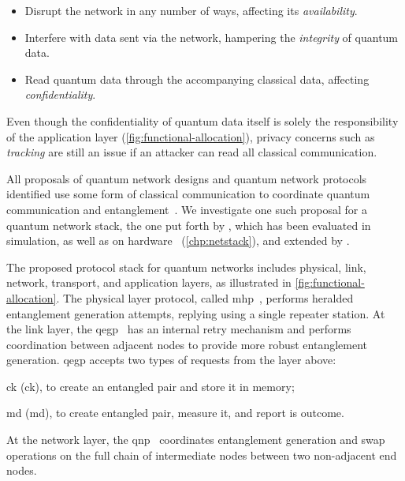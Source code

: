 \begin{itemize}
    \item Disrupt the network in any number of ways, affecting its \emph{availability}.
    \item Interfere with data sent via the network, hampering the \emph{integrity} of quantum data.
    \item Read quantum data through the accompanying classical data, affecting
          \emph{confidentiality}.
\end{itemize}
Even though the confidentiality of quantum data itself is solely the responsibility of the
application layer (\cref{fig:functional-allocation}), privacy concerns such as \emph{tracking} are
still an issue if an attacker can read all classical communication.

All proposals of quantum network designs and quantum network protocols identified use some form of
classical communication to coordinate quantum communication and
entanglement~\cite{van_meter_2013_repeaters, schoute_2016_shortcuts, joshi_2020_trusted,
pirker_2019_quantum, kozlowski_2019_towards, dahlberg_2019_egp, kozlowski_2020_qnp}. We investigate
one such proposal for a quantum network stack, the one put forth by \textcite{dahlberg_2019_egp},
which has been evaluated in simulation, as well as on hardware~\cite{pompili_2022_experimental}
(\cref{chp:netstack}), and extended by \textcite{kozlowski_2020_qnp}.

The proposed protocol stack for quantum networks includes physical, link, network, transport, and
application layers, as illustrated in \cref{fig:functional-allocation}. The physical layer protocol,
called \acrfull{mhp}~\cite{dahlberg_2019_egp}, performs heralded entanglement generation attempts,
replying using a single repeater station. At the link layer, the
\acrfull{qegp}~\cite{dahlberg_2019_egp} has an internal retry mechanism and performs coordination
between adjacent nodes to provide more robust entanglement generation. \acrshort{qegp} accepts two
types of requests from the layer above:
%
\begin{inlinelist}
    \item \acrlong{ck} (\acrshort{ck}), to create an entangled pair and store it in memory;
    \item \acrlong{md} (\acrshort{md}), to create entangled pair, measure it, and report is outcome.
\end{inlinelist}
At the network layer, the \acrfull{qnp}~\cite{kozlowski_2020_qnp} coordinates entanglement
generation and swap operations on the full chain of intermediate nodes between two non-adjacent end
nodes.


